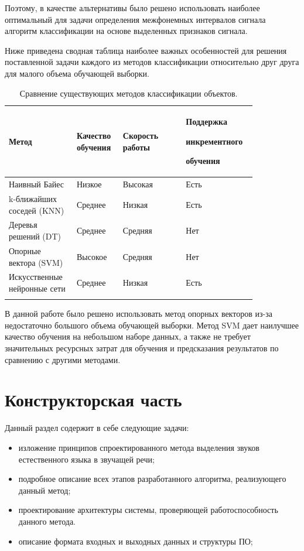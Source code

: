 \documentclass[utf8x, 14pt, oneside, a4paper]{article}
\begin{document}
	Поэтому, в качестве альтернативы было решено использовать наиболее оптимальный для задачи определения межфонемных интервалов сигнала алгоритм классификации на основе выделенных признаков сигнала.
	
	Ниже приведена сводная таблица наиболее важных особенностей для решения поставленной задачи каждого из методов классификации относительно друг друга для малого объема обучающей выборки.
	
	\begin{center}
		\begin{longtable}[h!]{|p{0.23\linewidth}|p{0.15\linewidth}|p{0.23\linewidth}|p{0.23\linewidth}|}
			\hline
			{Метод} & {Качество обучения} & {Скорость работы} & {Поддержка 
				
				инкрементного
			
		обучения}\\
			\hline
			{Наивный Байес} & {Низкое} & {Высокая} & {Есть}\\
			\hline
			{k-ближайших соседей (KNN)} & {Среднее} & {Низкая} & {Есть}\\
			\hline
			{Деревья решений (DT)} & {Среднее} & {Средняя} & {Нет}\\
			\hline
			{Опорные вектора (SVM)} & {Высокое} & {Средняя} & {Нет}\\
			\hline
			{Искусственные нейронные сети} & {Среднее} & {Низкая} & {Есть}\\
			\hline
			\caption{Сравнение существующих методов классификации объектов.}
		\end{longtable}
	\end{center}
	
	
	В данной работе было решено использовать метод опорных векторов из-за недостаточно большого объема обучающей выборки. Метод SVM дает наилучшее качество обучения на небольшом наборе данных, а также не требует значительных ресурсных затрат для обучения и предсказания результатов по сравнению с другими методами.
	
	\pagebreak
	
	\section{Конструкторская часть}\label{constructor}
	
	Данный раздел содержит в себе следующие задачи:
	\begin{itemize}
		\item изложение принципов спроектированного метода выделения звуков естественного языка в звучащей речи;
		\item подробное описание всех этапов разработанного алгоритма, реализующего данный метод;
		\item проектирование архитектуры системы, проверяющей работоспособность данного метода.
		\item описание формата входных и выходных данных и структуры ПО;
	\end{itemize}
	
\end{document}
